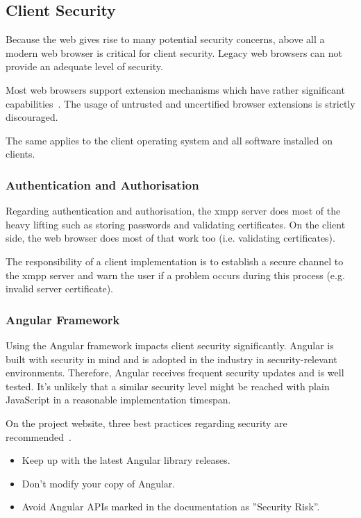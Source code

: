 \subsection{Client Security}

Because the web gives rise to many potential security concerns, above all a modern web browser is critical for client security.
Legacy web browsers can not provide an adequate level of security.~\cite{firefox-update-security}

Most web browsers support extension mechanisms which have rather significant capabilities~\cite{browser-extension-security}.
The usage of untrusted and uncertified browser extensions is strictly discouraged.

The same applies to the client operating system and all software installed on clients.

\subsubsection{Authentication and Authorisation}

Regarding authentication and authorisation, the \gls{xmpp} server does most of the heavy lifting such as storing passwords and validating certificates.
On the client side, the web browser does most of that work too (i.e. validating certificates).

The responsibility of a client implementation is to establish a secure channel to the \gls{xmpp} server and warn the user if a problem occurs during this process (e.g. invalid server certificate).

\subsubsection{Angular Framework}

Using the Angular framework impacts client security significantly.
Angular is built with security in mind and is adopted in the industry in security-relevant environments.
Therefore, Angular receives frequent security updates and is well tested.
It's unlikely that a similar security level might be reached with plain JavaScript in a reasonable implementation timespan.

On the project website, three best practices regarding security are recommended~\cite{angular-security}.

\begin{itemize}
    \item Keep up with the latest Angular library releases.
    \item Don't modify your copy of Angular.
    \item Avoid Angular APIs marked in the documentation as ''Security Risk''.
\end{itemize}

